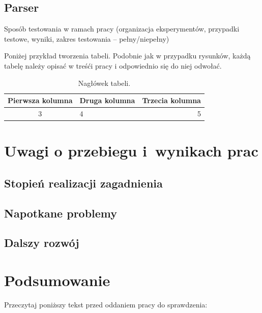 \documentclass[a4paper]{book}
\begin{document}
\section {Parser}
Sposób testowania w ramach pracy (organizacja eksperymentów, przypadki testowe, wyniki, zakres testowania -- pełny/niepełny)

Poniżej przykład tworzenia tabeli. Podobnie jak w przypadku rysunków, każdą tabelę należy opisać w treśći pracy i odpowiednio się do niej odwołać.

\begin{table}
	\centering
	\caption{Nagłówek tabeli.}
	\begin{tabular}{|c|l|r|}
		\hline
		Pierwsza kolumna & Druga kolumna & Trzecia kolumna \\
		\hline
		3 & 4 & 5 \\
		\hline 
	\end{tabular}
	\label{tab:przyklad_tabeli}
\end{table}

\chapter{Uwagi o przebiegu i~wynikach prac}
\section {Stopień realizacji zagadnienia}
\section{Napotkane problemy}
\section{Dalszy rozwój}

\chapter{Podsumowanie}


Przeczytaj poniższy tekst przed oddaniem pracy do sprawdzenia:


\end{document}
